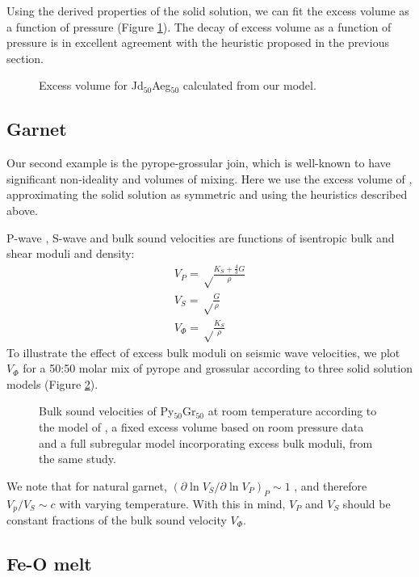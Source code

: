 \documentclass[review]{elsarticle}
\begin{document}
Using the derived properties of the solid solution, we can fit the excess volume as a function of pressure (Figure \ref{fig:excess_volume_jadeite_aegirine}). The decay of excess volume as a function of pressure is in excellent agreement with the heuristic proposed in the previous section.

\begin{figure}[ht!]
  \centering
  \caption{Excess volume for Jd$_{50}$Aeg$_{50}$ calculated from our model.}
  \label{fig:excess_volume_jadeite_aegirine}
\end{figure}

\subsection{Garnet}
Our second example is the pyrope-grossular join, which is well-known to have significant non-ideality and volumes of mixing. Here we use the excess volume of \cite{DCW2015}, approximating the solid solution as symmetric and using the heuristics described above.

P-wave , S-wave and bulk sound velocities are functions of isentropic bulk and shear moduli and density:
\begin{eqnarray}
V_P = \sqrt \frac{K_S + \frac{4}{3} G }{\rho} \\
V_S = \sqrt \frac{G}{\rho} \\
V_\Phi = \sqrt \frac{K_S}{\rho}
\end{eqnarray}
To illustrate the effect of excess bulk moduli on seismic wave velocities, we plot $V_\Phi$ for a 50:50 molar mix of pyrope and grossular according to three solid solution models (Figure \ref{fig:bulk_sound_garnet}).

\begin{figure}[ht!]
  \centering
  \caption{Bulk sound velocities of Py$_{50}$Gr$_{50}$ at room temperature according to the model of \citep{GCT1996}, a fixed excess volume based on room pressure data \citep{DCW2015} and a full subregular model incorporating excess bulk moduli, from the same study.}
  \label{fig:bulk_sound_garnet}
\end{figure}

We note that for natural garnet, $(\partial \ln V_S / \partial \ln V_P)_P \sim 1$ \citep{CBS1997}, and therefore $V_p/V_S \sim c$ with varying temperature. With this in mind, $V_P$ and $V_S$ should be constant fractions of the bulk sound velocity $V_\Phi$.
\subsection{Fe-O melt}
\end{document}
